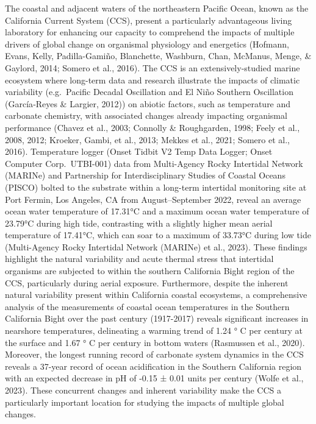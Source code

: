 \documentclass{CSUNthesis}
\begin{document}
The coastal and adjacent waters of the northeastern Pacific Ocean, known as the California Current System (CCS), present a particularly advantageous living laboratory for enhancing our capacity to comprehend the impacts of multiple drivers of global change on organismal physiology and energetics (Hofmann, Evans, Kelly, Padilla-Gamiño, Blanchette, Washburn, Chan, McManus, Menge, \& Gaylord, 2014; Somero et al., 2016). The CCS is an extensively-studied marine ecosystem where long-term data and research illustrate the impacts of climatic variability (e.g.~Pacific Decadal Oscillation and El Niño Southern Oscillation (García‐Reyes \& Largier, 2012)) on abiotic factors, such as temperature and carbonate chemistry, with associated changes already impacting organismal performance (Chavez et al., 2003; Connolly \& Roughgarden, 1998; Feely et al., 2008, 2012; Kroeker, Gambi, et al., 2013; Mekkes et al., 2021; Somero et al., 2016). Temperature logger (Onset Tidbit V2 Temp Data Logger; Onset Computer Corp.~UTBI-001) data from Multi-Agency Rocky Intertidal Network (MARINe) and Partnership for Interdisciplinary Studies of Coastal Oceans (PISCO) bolted to the substrate within a long-term intertidal monitoring site at Port Fermin, Los Angeles, CA from August--September 2022, reveal an average ocean water temperature of 17.31°C and a maximum ocean water temperature of 23.79°C during high tide, contrasting with a slightly higher mean aerial temperature of 17.41°C, which can soar to a maximum of 33.73°C during low tide (Multi-Agency Rocky Intertidal Network (MARINe) et al., 2023). These findings highlight the natural variability and acute thermal stress that intertidal organisms are subjected to within the southern California Bight region of the CCS, particularly during aerial exposure. Furthermore, despite the inherent natural variability present within California coastal ecosystems, a comprehensive analysis of the measurements of coastal ocean temperatures in the Southern California Bight over the past century (1917-2017) reveals significant increases in nearshore temperatures, delineating a warming trend of 1.24 ° C per century at the surface and 1.67 ° C per century in bottom waters (Rasmussen et al., 2020). Moreover, the longest running record of carbonate system dynamics in the CCS reveals a 37-year record of ocean acidification in the Southern California region with an expected decrease in pH of -0.15 ± 0.01 units per century (Wolfe et al., 2023). These concurrent changes and inherent variability make the CCS a particularly important location for studying the impacts of multiple global changes.
\end{document}
